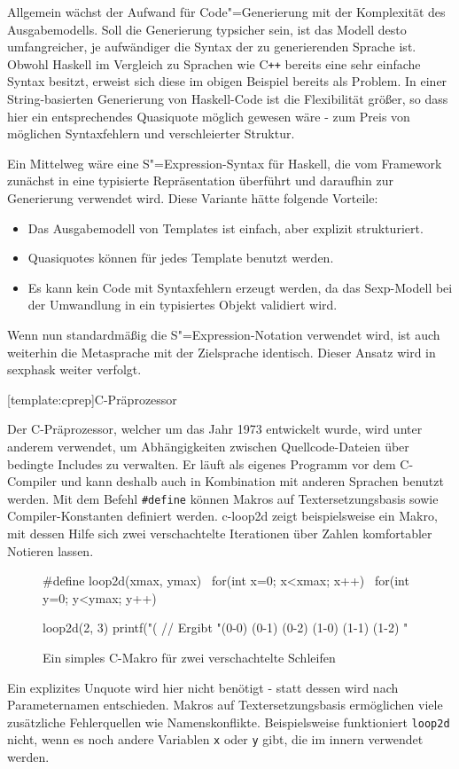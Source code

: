 \documentclass[11pt, a4paper, bibgerm]{scrbook}
\newcommand\icode[1]{\lstinline?#1?}
\newcommand\lsection{}
\newcommand\cref{}
\newcommand\abb{}
\newcommand{\sexp}{S"=Expression}
\newcommand{\cgen}{Code"=Generierung}
\newcommand{\cpp}{C\texttt{++}}
\begin{document}
Allgemein wächst der Aufwand für \cgen{} mit der Komplexität des
Ausgabemodells. Soll die Generierung typsicher sein, ist das Modell
desto umfangreicher, je aufwändiger die Syntax der zu generierenden
Sprache ist. Obwohl Haskell im Vergleich zu Sprachen wie \cpp{} bereits
eine sehr einfache Syntax besitzt, erweist sich diese im obigen Beispiel
bereits als Problem. In einer String-basierten Generierung von
Haskell-Code ist die Flexibilität größer, so dass hier ein
entsprechendes Quasiquote möglich gewesen wäre - zum Preis von möglichen
Syntaxfehlern und verschleierter Struktur.

Ein Mittelweg wäre eine \sexp{}-Syntax für Haskell, die vom Framework
zunächst in eine typisierte Repräsentation überführt und daraufhin zur
Generierung verwendet wird. Diese Variante hätte folgende Vorteile:
\begin{itemize}
\item Das Ausgabemodell von Templates ist einfach, aber explizit
  strukturiert.
\item Quasiquotes können für jedes Template benutzt werden.
\item Es kann kein Code mit Syntaxfehlern erzeugt werden, da das
  Sexp-Modell bei der Umwandlung in ein typisiertes Objekt validiert wird.
\end{itemize}
Wenn nun standardmäßig die \sexp{}-Notation verwendet wird, ist auch
weiterhin die Metasprache mit der Zielsprache identisch. Dieser Ansatz
wird in \cref{sexphask} weiter verfolgt.

\lsection[template:cprep]{C-Präprozessor}

Der C-Präprozessor, welcher um das Jahr 1973 entwickelt wurde\cite{CPrep}, wird
unter anderem verwendet, um Abhängigkeiten zwischen Quellcode-Dateien
über bedingte Includes zu verwalten. Er läuft als eigenes Programm vor
dem C-Compiler und kann deshalb auch in Kombination mit anderen Sprachen
benutzt werden. Mit dem Befehl \icode{#define} können Makros auf
Textersetzungsbasis sowie Compiler-Konstanten definiert
werden. \abb{c-loop2d} zeigt beispielsweise ein Makro, mit dessen Hilfe
sich zwei verschachtelte Iterationen über Zahlen komfortabler Notieren
lassen.
\begin{figure}[h]
  \centering
  \begin{code}
#define loop2d(xmax, ymax)   \
  for(int x=0; x<xmax; x++)  \
   for(int y=0; y<ymax; y++)

loop2d(2, 3) {
  printf("(%
}
// Ergibt "(0-0) (0-1) (0-2) (1-0) (1-1) (1-2) "
  \end{code}
\caption{Ein simples C-Makro für zwei verschachtelte Schleifen}
  \label{magicl:fig:c-loop2d}
\end{figure}
Ein explizites Unquote wird hier nicht benötigt - statt dessen wird nach
Parameternamen entschieden. Makros auf Textersetzungsbasis ermöglichen
viele zusätzliche Fehlerquellen wie Namenskonflikte. Beispielsweise
funktioniert \icode{loop2d} nicht, wenn es noch andere Variablen
\icode{x} oder \icode{y} gibt, die im innern verwendet werden.
\end{document}
